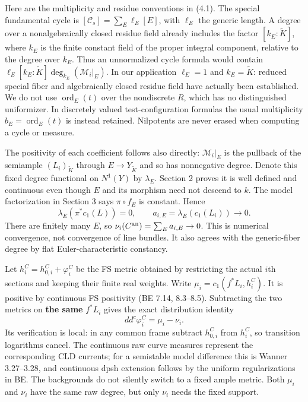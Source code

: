 \documentclass[
  10pt,
]{article}
\begin{document}
Here are the multiplicity and residue conventions in (4.1). The special
fundamental cycle is \([\mathcal C_s]=\sum_E\ell_E[E]\), with \(\ell_E\)
the generic length. A degree over a nonalgebraically closed residue
field already includes the factor \([k_E:\widetilde K]\), where \(k_E\)
is the finite constant field of the proper integral component, relative
to the degree over \(k_E\). Thus an unnormalized cycle formula would
contain \(\ell_E[k_E:\widetilde K]\deg_{k_E}(\mathcal M_i|_E)\). In our
application \(\ell_E=1\) and \(k_E=\widetilde K\): reduced special fiber
and algebraically closed residue field have actually been established.
We do not use \(\operatorname{ord}_E(t)\) over the nondiscrete \(R\),
which has no distinguished uniformizer. In discretely valued
test-configuration formulas the usual multiplicity
\(b_E=\operatorname{ord}_E(t)\) is instead retained. Nilpotents are
never erased when computing a cycle or measure.

The positivity of each coefficient follows also directly:
\(\mathcal M_i|_E\) is the pullback of the semiample
\((L_i)_{\widetilde K}\) through \(E\to Y_{\widetilde K}\) and so has
nonnegative degree. Denote this fixed degree functional on \(N^1(Y)\) by
\(\lambda_E\). Section 2 proves it is well defined and continuous even
though \(E\) and its morphism need not descend to \(k\). The model
factorization in Section 3 says \(\pi\circ f_E\) is constant. Hence
\[\lambda_E(\pi^*c_1(L))=0,\qquad
a_{i,E}=\lambda_E(c_1(L_i))\longrightarrow0.                            \tag{4.2}\]
There are finitely many \(E\), so
\(\nu_i(C^{\rm an})=\sum_Ea_{i,E}\to0\). This is numerical convergence,
not convergence of line bundles. It also agrees with the generic-fiber
degree by flat Euler-characteristic constancy.

Let \(h_i^C=h_{0,i}^C+\varphi_i^C\) be the FS metric obtained by
restricting the actual \(i\)th sections and keeping their finite real
weights. Write \(\mu_i=c_1(f^*L_i,h_i^C)\). It is positive by continuous
FS positivity (BE 7.14, 8.3--8.5). Subtracting the two metrics on
\textbf{the same} \(f^*L_i\) gives the exact distribution identity
\[dd^c\varphi_i^C=\mu_i-\nu_i.                                        \tag{4.3}\]
Its verification is local: in any common frame subtract \(h_{0,i}^C\)
from \(h_i^C\), so transition logarithms cancel. The continuous raw
curve measures represent the corresponding CLD currents; for a
semistable model difference this is Wanner 3.27--3.28, and continuous
dpsh extension follows by the uniform regularizations in BE. The
backgrounds do not silently switch to a fixed ample metric. Both
\(\mu_i\) and \(\nu_i\) have the same raw degree, but only \(\nu_i\)
needs the fixed support.
\end{document}
